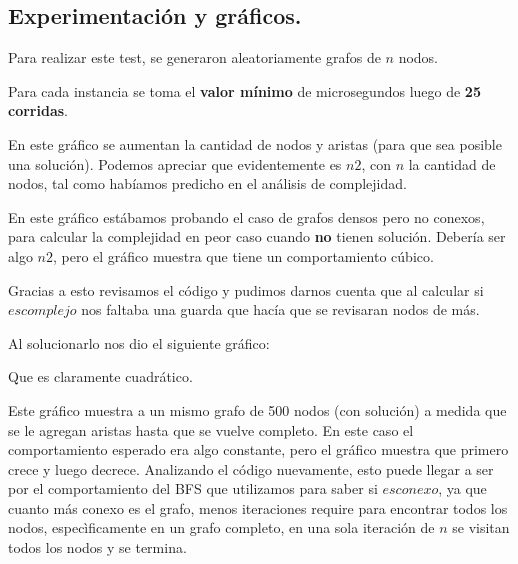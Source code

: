 \subsection{Experimentación y gráficos.}

\vspace*{0.3cm}

Para realizar este test, se generaron aleatoriamente grafos de $n$ nodos.

Para cada instancia se toma el \textbf{valor mínimo} de microsegundos luego de
\textbf{25 corridas}.


En este gráfico se aumentan la cantidad de nodos y aristas (para que sea
posible una solución). Podemos apreciar que evidentemente es $n2$, con $n$ la cantidad
de nodos, tal como habíamos predicho en el análisis de complejidad.

En este gráfico estábamos probando el caso de grafos densos pero no conexos,
para calcular la complejidad en peor caso cuando \textbf{no} tienen solución.
Debería ser algo $n2$, pero el gráfico muestra que tiene un comportamiento
cúbico.

Gracias a esto revisamos el código y pudimos darnos cuenta que al calcular si $es
complejo$ nos faltaba una guarda que hacía que se revisaran nodos de más.

Al solucionarlo nos dio el siguiente gráfico:


Que es claramente cuadrático.


Este gráfico muestra a un mismo grafo de 500 nodos (con solución) a medida que
se le agregan aristas hasta que se vuelve completo.
En este caso el comportamiento esperado era algo constante, pero el gráfico
muestra que primero crece y luego decrece.
Analizando el código nuevamente, esto puede llegar a ser por el comportamiento
del BFS que utilizamos para saber si $es conexo$, ya que cuanto más conexo es
el grafo, menos iteraciones require para encontrar todos los nodos,
especìficamente en un grafo completo, en una sola iteración de $n$ se visitan
todos los nodos y se termina.


